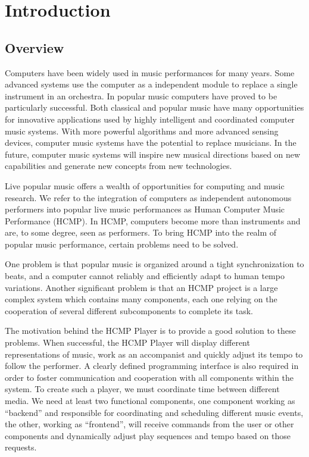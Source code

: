 \chapter{Introduction}

\ifpdf
    \graphicspath{{1_introduction/figures/PNG/}{1_introduction/figures/PDF/}{1_introduction/figures/}}
\else
    \graphicspath{{1_introduction/figures/EPS/}{1_introduction/figures/}}
\fi

\section{Overview}
Computers have been widely used in music performances for many years. Some
advanced systems use the computer as a independent module to replace a
single instrument in an orchestra. In popular music computers have proved
to be particularly successful. Both classical and popular music have many
opportunities for innovative applications used by highly intelligent and
coordinated computer music systems. With more powerful algorithms and more
advanced sensing devices, computer music systems have the potential to
replace musicians. In the future, computer music systems will inspire new 
musical directions based on new
capabilities and generate new concepts from new technologies.

Live popular music offers a wealth of opportunities for computing and music
research.  We refer to the integration of computers as independent autonomous
performers into popular live music performances as Human Computer Music
Performance (HCMP). In HCMP, computers become more than instruments and are,
to some degree, seen as performers. To bring HCMP into the realm of popular
music performance, certain problems need to be solved. 

One problem is that
popular music is organized around a tight synchronization to beats, and a
computer cannot reliably and efficiently adapt to human tempo variations.
Another significant problem is that an HCMP project is a large complex
system which contains many components, each one relying on the cooperation of several
different subcomponents to complete its task.

The motivation behind the HCMP Player is to provide a good solution to these
problems. When successful, the HCMP Player will display different
representations of music, work as an accompanist and quickly adjust its
tempo to follow the performer. A clearly defined programming interface is
also required in order to foster communication and cooperation with all
components within the system. To create such a player, we must coordinate
time between different media. We need at least two functional components,
one component working as ``backend'' and responsible for coordinating and
scheduling different music events, the other, working as ``frontend'', will
receive commands from the user or other components and dynamically adjust
play sequences and tempo based on those requests.


